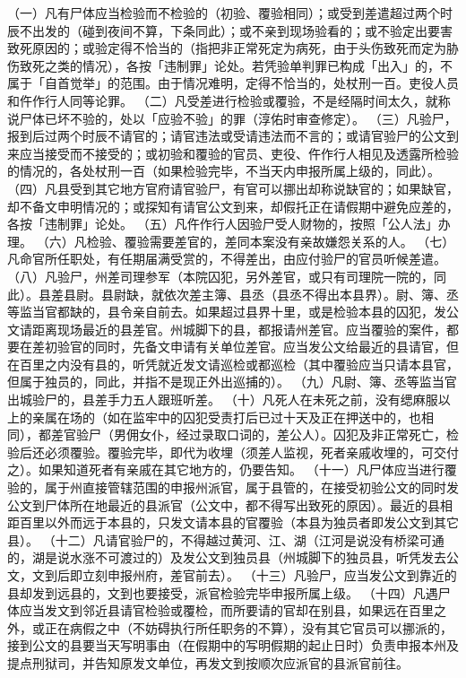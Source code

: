 \documentclass[12pt,UTF8]{ctexbook}
\begin{document}
（一）凡有尸体应当检验而不检验的（初验、覆验相同）；或受到差遣超过两个时辰不出发的（碰到夜间不算，下条同此）；或不亲到现场验看的；或不验定出要害致死原因的；或验定得不恰当的（指把非正常死定为病死，由于头伤致死而定为胁伤致死之类的情况），各按「违制罪」论处。若凭验单判罪已构成「出入」的，不属于「自首觉举」的范围。由于情况难明，定得不恰当的，处杖刑一百。吏役人员和仵作行人同等论罪。
（二）凡受差进行检验或覆验，不是经隔时间太久，就称说尸体已坏不验的，处以「应验不验」的罪（淳佑时审查修定）。
（三）凡验尸，报到后过两个时辰不请官的；请官违法或受请违法而不言的；或请官验尸的公文到来应当接受而不接受的；或初验和覆验的官员、吏役、仵作行人相见及透露所检验的情况的，各处杖刑一百（如果检验完毕，不当天内申报所属上级的，同此）。
（四）凡县受到其它地方官府请官验尸，有官可以挪出却称说缺官的；如果缺官，却不备文申明情况的；或探知有请官公文到来，却假托正在请假期中避免应差的，各按「违制罪」论处。
（五）凡仵作行人因验尸受人财物的，按照「公人法」办理。
（六）凡检验、覆验需要差官的，差同本案没有亲故嫌怨关系的人。
（七）凡命官所任职处，有任期届满受赏的，不得差出，由应付验尸的官员听候差遣。
（八）凡验尸，州差司理参军（本院囚犯，另外差官，或只有司理院一院的，同此）。县差县尉。县尉缺，就依次差主簿、县丞（县丞不得出本县界）。尉、簿、丞等监当官都缺的，县令亲自前去。如果超过县界十里，或是检验本县的囚犯，发公文请距离现场最近的县差官。州城脚下的县，都报请州差官。应当覆验的案件，都要在差初验官的同时，先备文申请有关单位差官。应当发公文给最近的县请官，但在百里之内没有县的，听凭就近发文请巡检或都巡检（其中覆验应当只请本县官，但属于独员的，同此，并指不是现正外出巡捕的）。
（九）凡尉、簿、丞等监当官出城验尸的，县差手力五人跟班听差。
（十）凡死人在未死之前，没有缌麻服以上的亲属在场的（如在监牢中的囚犯受责打后已过十天及正在押送中的，也相同），都差官验尸（男佣女仆，经过录取口词的，差公人）。囚犯及非正常死亡，检验后还必须覆验。覆验完毕，即代为收埋（须差人监视，死者亲戚收埋的，可交付之）。如果知道死者有亲戚在其它地方的，仍要告知。
（十一）凡尸体应当进行覆验的，属于州直接管辖范围的申报州派官，属于县管的，在接受初验公文的同时发公文到尸体所在地最近的县派官（公文中，都不得写出致死的原因）。最近的县相距百里以外而远于本县的，只发文请本县的官覆验（本县为独员者即发公文到其它县）。
（十二）凡请官验尸的，不得越过黄河、江、湖（江河是说没有桥梁可通的，湖是说水涨不可渡过的）及发公文到独员县（州城脚下的独员县，听凭发去公文，文到后即立刻申报州府，差官前去）。
（十三）凡验尸，应当发公文到靠近的县却发到远县的，文到也要接受，派官检验完毕申报所属上级。
（十四）凡遇尸体应当发文到邻近县请官检验或覆检，而所要请的官却在别县，如果远在百里之外，或正在病假之中（不妨碍执行所任职务的不算），没有其它官员可以挪派的，接到公文的县要当天写明事由（在假期中的写明假期的起止日时）负责申报本州及提点刑狱司，并告知原发文单位，再发文到按顺次应派官的县派官前往。
\end{document}
